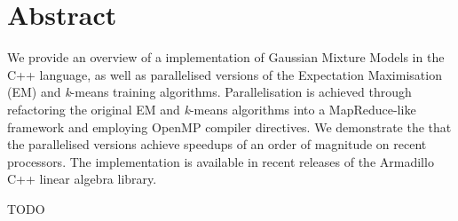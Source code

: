 \section*{Abstract}

We provide an overview of a implementation of Gaussian Mixture Models in the C++ language,
as well as parallelised versions of the Expectation Maximisation (EM) and {\it k}-means training algorithms.
Parallelisation is achieved through refactoring the original EM and {\it k}-means algorithms into a MapReduce-like framework
and employing OpenMP compiler directives.
We demonstrate the that the parallelised versions achieve speedups of an order of magnitude on recent processors.
The implementation is available in recent releases of the Armadillo C++ linear algebra library.

TODO

